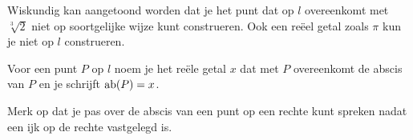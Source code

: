 Wiskundig kan aangetoond worden dat je het punt dat op $l$ overeenkomt met $\sqrt[3]{2}$ niet op soortgelijke wijze kunt construeren.
Ook een re\"eel getal zoals $\pi$ kun je niet op $l$ construeren.\vspace{2mm}

\begin{definitie}
	Voor een punt $P$ op $l$ noem je het re\"ele getal $x$ dat met $P$ overeenkomt de abscis van $P$ en je schrijft $\operatorname{ab} (P)=x$.
\end{definitie}

\begin{center}
\end{center}



Merk op dat je pas over de abscis van een punt op een rechte kunt spreken nadat een ijk op de rechte vastgelegd is.\vspace{2mm}

